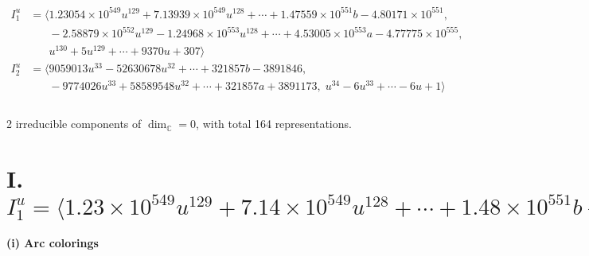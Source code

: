 \documentclass[1p]{elsarticle_modified}
\theoremstyle{definition}
\begin{document}
\begin{align*}
I^u_{1}&=\langle 
1.23054\times10^{549} u^{129}+7.13939\times10^{549} u^{128}+\cdots+1.47559\times10^{551} b-4.80171\times10^{551},\\
\phantom{I^u_{1}}&\phantom{= \langle  }-2.58879\times10^{552} u^{129}-1.24968\times10^{553} u^{128}+\cdots+4.53005\times10^{553} a-4.77775\times10^{555},\\
\phantom{I^u_{1}}&\phantom{= \langle  }u^{130}+5 u^{129}+\cdots+9370 u+307\rangle \\
I^u_{2}&=\langle 
9059013 u^{33}-52630678 u^{32}+\cdots+321857 b-3891846,\\
\phantom{I^u_{2}}&\phantom{= \langle  }-9774026 u^{33}+58589548 u^{32}+\cdots+321857 a+3891173,\;u^{34}-6 u^{33}+\cdots-6 u+1\rangle \\
\\
\end{align*}
\raggedright * 2 irreducible components of $\dim_{\mathbb{C}}=0$, with total 164 representations.\\
\newpage
\renewcommand{\arraystretch}{1}
\centering \section*{I. $I^u_{1}= \langle 1.23\times10^{549} u^{129}+7.14\times10^{549} u^{128}+\cdots+1.48\times10^{551} b-4.80\times10^{551},\;-2.59\times10^{552} u^{129}-1.25\times10^{553} u^{128}+\cdots+4.53\times10^{553} a-4.78\times10^{555},\;u^{130}+5 u^{129}+\cdots+9370 u+307 \rangle$}
\flushleft \textbf{(i) Arc colorings}\\
\end{document}

